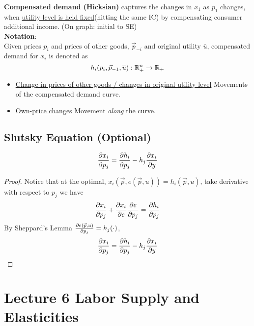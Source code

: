 \documentclass[]{article}
\begin{document}
            \begin{definition}
                \textbf{Compensated demand (Hicksian)} captures the changes in $x_1$ as $p_1$ changes, when \ul{utility level is held fixed}(hitting the same IC) by compensating consumer additional income. (On graph: initial to SE)
                \\\textbf{Notation}:
                \\Given prices $p_i$ and prices of other goods, $\vec{p}_{-i}$ and original utility $\overline{u}$, compensated demand for $x_i$ is denoted as
                \[
                    h_i(p_i, \vec{p}_{-1}, \overline{u}): \mathbb{R}^n_+ \rightarrow \mathbb{R}_+
                \]
            \end{definition}
            \begin{remark}
                \begin{itemize}
                    \item \ul{Change in prices of other goods / changes in original utility level} Movements of the compensated demand curve.
                    \item \ul{Own-price changes} Movement \emph{along} the curve.
                \end{itemize}
            \end{remark}
            
        \subsection{Slutsky Equation (Optional)}
        \begin{theorem}
            \[
                \frac{\partial{x_i}}{\partial{p_j}} = \frac{\partial{h_i}}{\partial{p_j}} - h_j \frac{\partial{x_i}}{\partial{y}}
            \]
        \end{theorem}
        \begin{proof}
            Notice that at the optimal, $x_i(\vec{p}, e(\vec{p}, u)) = h_i(\vec{p}, u)$, take derivative with respect to $p_j$ we have
            \[
                \frac{\partial{x_i}}{\partial{p_j}} + \frac{\partial{x_i}}{\partial{e}} \frac{\partial{e}}{\partial{p_j}} = \frac{\partial{h_i}}{\partial{p_j}}
            \]
            By Sheppard's Lemma $\frac{\partial{e(\vec{p}, u)}}{\partial{p_j}} = h_j(\cdot)$, 
            \[
                \frac{\partial{x_i}}{\partial{p_j}} = \frac{\partial{h_i}}{\partial{p_j}} - h_j \frac{\partial{x_i}}{\partial{y}}
            \]
        \end{proof}
    
    \section{Lecture 6 Labor Supply and Elasticities}
\end{document}
